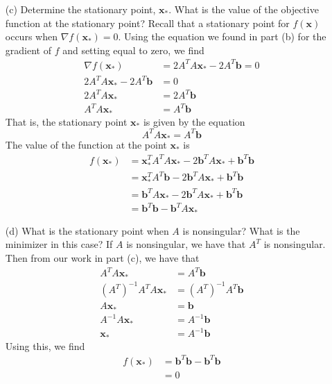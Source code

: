 \documentclass{article}
\begin{document}
\begin{itemize}
\begin{itemize}
        \item[(c)] Determine the stationary point, $\mathbf{x}_*$. What is the value of the objective function at the stationary point?
        \newline\newline
        Recall that a stationary point for $f(\mathbf{x})$ occurs when $\nabla f(\mathbf{x}_*) = 0$. Using the equation we found in part (b) for the gradient of $f$ and setting equal to zero, we find
        \begin{align*}
            \nabla f(\mathbf{x}_*) &= 2A^TA\mathbf{x}_* - 2A^T\mathbf{b} = 0\\
            2A^TA\mathbf{x}_* - 2A^T\mathbf{b} &= 0\\
            2A^TA\mathbf{x}_* &= 2A^T\mathbf{b}\\
            A^TA\mathbf{x}_* &= A^T\mathbf{b}
        \end{align*}
        That is, the stationary point $\mathbf{x}_*$ is given by the equation
        \[A^TA\mathbf{x}_* = A^T\mathbf{b}\]
        The value of the function at the point $\mathbf{x}_*$ is
        \begin{align*}
            f(\mathbf{x}_*) &= \mathbf{x}_*^TA^TA\mathbf{x}_* - 2\mathbf{b}^TA\mathbf{x}_* + \mathbf{b}^T\mathbf{b}\\
            &= \mathbf{x}_*^TA^T\mathbf{b} - 2\mathbf{b}^TA\mathbf{x}_* + \mathbf{b}^T\mathbf{b}\\
            &= \mathbf{b}^TA\mathbf{x}_* - 2\mathbf{b}^TA\mathbf{x}_* + \mathbf{b}^T\mathbf{b}\\
            &= \mathbf{b}^T\mathbf{b} - \mathbf{b}^TA\mathbf{x}_*
        \end{align*}

        \item[(d)] What is the stationary point when $A$ is nonsingular? What is the minimizer in this case?
        \newline\newline
        If $A$ is nonsingular, we have that $A^T$ is nonsingular. Then from our work in part (c), we have that
        \begin{align*}
            A^TA\mathbf{x}_* &= A^T\mathbf{b}\\
            (A^T)^{-1}A^TA\mathbf{x}_* &= (A^T)^{-1}A^T\mathbf{b}\\
            A\mathbf{x}_* &= \mathbf{b}\\
            A^{-1}A\mathbf{x}_* &= A^{-1}\mathbf{b} \\
            \mathbf{x}_* &= A^{-1}\mathbf{b}
        \end{align*}
        Using this, we find
        \begin{align*}
            f(\mathbf{x}_*) &= \mathbf{b}^T\mathbf{b} - \mathbf{b}^T\mathbf{b}\\
            &= 0
        \end{align*}


\end{itemize}
\end{itemize}
\end{document}
